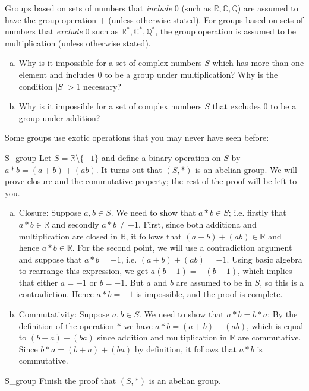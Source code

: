 \begin{rem}
Groups based on sets of numbers that \emph{include} 0 (such as ${\mathbb R}, {\mathbb C}, {\mathbb Q}$) are assumed to have the group operation $+$ (unless otherwise stated). For groups based on sets of numbers that \emph{exclude} $0$ such as ${\mathbb R^\ast}, {\mathbb C^\ast}, {\mathbb Q^\ast}$, the group operation is assumed to be multiplication (unless otherwise stated).
\end{rem}
 
\begin{exercise}{15}
\begin{enumerate}[(a)]
\item
Why is it impossible for a set of complex numbers $S$ which has more than one element and  includes 0 to be a group under multiplication?  Why is the condition $|S|>1$ necessary?
\item
 Why is it impossible for a set of complex numbers $S$ that excludes 0 to be a group under addition?
\end{enumerate}
\end{exercise} 
 
Some groups use exotic operations that you may never have seen before:

\begin{example}{S_group}
Let $S = {\mathbb R} \setminus \{ -1 \}$ and define a binary operation on
$S$ by $a \ast b = (a + b) + (ab)$. It turns out that $(S, \ast)$ is an abelian group. We will prove closure and the commutative property; the rest of the proof will be left to you.
\begin{enumerate}[(a)]
\item
Closure:  Suppose $a, b \in S$.  We need to show that $a \ast b \in S$; i.e. firstly that $a \ast b \in {\mathbb R}$ and secondly $a \ast b \neq -1$.
First, since both additiona and multiplication are closed in  ${\mathbb R}$, it follows that $(a + b) + (ab) \in {\mathbb R}$ and hence $a \ast b \in {\mathbb R}$. For the second point,  we will use a contradiction argument and suppose that $a \ast b = -1$, i.e. $(a + b) + (ab) = -1$.  Using basic algebra to rearrange this expression, we get
$a(b-1) = -(b-1)$, which implies that either $a = -1$ or $b=-1$. But $a$ and $b$ are assumed to be in $S$, so this is a contradiction. Hence $a \ast b =-1$ is impossible, and the proof is complete.
\item
Commutativity:  Suppose $a, b \in S$.  We need to show that $a \ast b = b \ast a$:
By the definition of the operation $\ast$ we have $a \ast b = (a + b) + (a b)$, which is equal to  $(b + a) + (ba)$ since addition and multiplication in ${\mathbb R}$ are commutative. Since  $b \ast a = (b + a) + (b a)$ by definition, it follows that $a \ast b$ is commutative.
\end{enumerate}

\begin{exercise}{S_group}
Finish the proof that $(S, \ast)$ is an abelian group.
\end{exercise}
\end{example}

